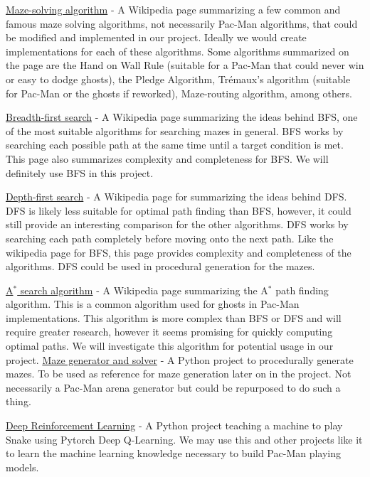 \documentclass[12pt]{article}
\begin{document}
        \href{https://en.wikipedia.org/wiki/Maze-solving_algorithm}{Maze-solving algorithm} - A Wikipedia page summarizing a few common and famous maze solving algorithms, not necessarily Pac-Man algorithms, that could be modified and implemented in our project. Ideally we would create implementations for each of these algorithms. Some algorithms summarized on the page are the Hand on Wall Rule (suitable for a Pac-Man that could never win or easy to dodge ghosts), the Pledge Algorithm, Trémaux's algorithm (suitable for Pac-Man or the ghosts if reworked), Maze-routing algorithm, among others\cite{WikiMaze}.

        \href{https://en.wikipedia.org/wiki/Breadth-first_search}{Breadth-first search} - A Wikipedia page summarizing the ideas behind BFS, one of the most suitable algorithms for searching mazes in general. BFS works by searching each possible path at the same time until a target condition is met. This page also summarizes complexity and completeness for BFS. We will definitely use BFS in this project\cite{WikiBFS}.

        \href{https://en.wikipedia.org/wiki/Depth-first_search}{Depth-first search} - A Wikipedia page for summarizing the ideas behind DFS. DFS is likely less suitable for optimal path finding than BFS, however, it could still provide an interesting comparison for the other algorithms. DFS works by searching each path completely before moving onto the next path. Like the wikipedia page for BFS, this page provides complexity and completeness of the algorithms. DFS could be used in procedural generation for the mazes\cite{WikiDFS}. 
        
        \href{https://en.wikipedia.org/wiki/A*_search_algorithm}{A$^*$ search algorithm} - A Wikipedia page summarizing the A$^*$ path finding algorithm. This is a common algorithm used for ghosts in Pac-Man implementations. This algorithm is more complex than BFS or DFS and will require greater research, however it seems promising for quickly computing optimal paths. We will investigate this algorithm for potential usage in our project\cite{WikiAStar}.
        \newpage
        \href{https://github.com/jostbr/pymaze}{Maze generator and solver} - A Python project to procedurally generate mazes. To be used as reference for maze generation later on in the project. Not necessarily a Pac-Man arena generator but could be repurposed to do such a thing\cite{jostbrpymaze}.

        \href{https://github.com/maurock/snake-ga}{Deep Reinforcement Learning} - A Python project teaching a machine to play Snake using Pytorch Deep Q-Learning. We may use this and other projects like it to learn the machine learning knowledge necessary to build Pac-Man playing models\cite{maurockML}.
\end{document}

